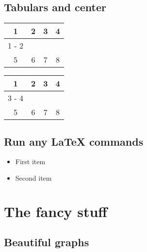 \documentclass[titlepage]{article}%
\begin{document}
\subsection{Tabulars and center}%
\label{subsec:Tabularsandcenter}%

%
%
\begin{tabular}{|cc|cc|}%
\hline%
1&2&3&4\\%
\cline{1%
-%
2}%
&&&\\%
5&6&7&8\\%
\hline%
\end{tabular}%
%
\begin{center}%
\begin{tabular}{|cc|cc|}%
\hline%
1&2&3&4\\%
\cline{3%
-%
4}%
&&&\\%
5&6&7&8\\%
\hline%
\end{tabular}%
\end{center}%
%
\subsection{Run any LaTeX commands}%
\label{subsec:RunanyLaTeXcommands}%

%
%
\begin{itemize}
%
  \item First item
%
  \item Second item
%
  \end{itemize} %
\section{The fancy stuff}%
\label{sec:Thefancystuff}%
\subsection{Beautiful graphs}%
\label{subsec:Beautifulgraphs}%

%
\end{document}
